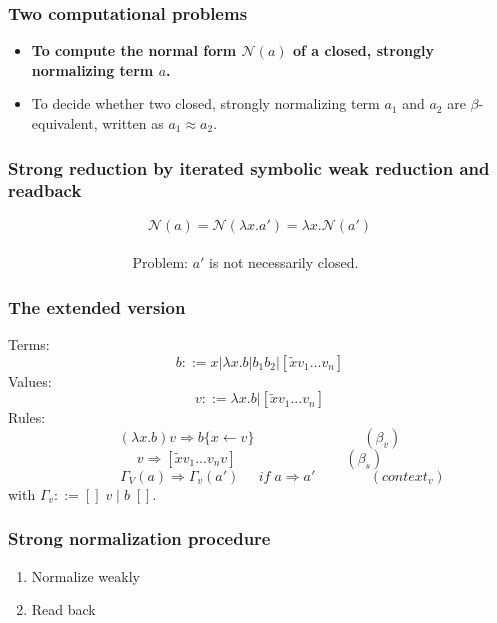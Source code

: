 \documentclass{beamer}
\begin{document}
\begin{frame}
\frametitle{Two computational problems}
\begin{itemize}
\item \textbf{To compute the normal form $\mathcal{N}(a)$ of a closed, strongly normalizing term $a$.}
\item To decide whether two closed, strongly normalizing term $a_1$ and $a_2$ are $\beta$-equivalent, written as $a_1 \approx a_2$.
\end{itemize}
\end{frame}

\begin{frame}
\frametitle{Strong reduction by iterated symbolic weak reduction and readback}
\begin{equation*}
\mathcal{N}(a) = \mathcal{N}(\lambda x.a') = \lambda x.\mathcal{N}(a')
\end{equation*}
$\;$\\
$\;\;\;\;\;\;\;\;\;\;\;\;\;\;\;\;\;\;\;\;\;\;\;\;\;\;\;\;\;\;\;\;$Problem: $a'$ is not necessarily closed.

\end{frame}

\begin{frame}
\frametitle{The extended version}
Terms:
\begin{equation*}
b ::= x | \lambda x.b | b_1 b_2 | [\tilde{x} v_1 ... v_n]
\end{equation*}
Values:
\begin{equation*}
v ::= \lambda x.b | [\tilde{x} v_1 ... v_n]
\end{equation*}
Rules: 
\begin{equation*}
(\lambda x.b) v  \Rightarrow b\{x \leftarrow v\} \;\;\;\;\;\;\;\;\;\;\;\;\;\;\;\;\;\;\;\;\;\;\;\;\;\;\;\;(\beta_v)
\end{equation*}
\begin{equation*}
[\tilde{x} v_1 ... v_n] v  \Rightarrow [\tilde{x} v_1 ... v_n v] \;\;\;\;\;\;\;\;\;\;\;\;\;\;\;\;\;\;\;\;\;\;\;\;\;\;\;\;(\beta_s)
\end{equation*}
\begin{equation*}
\;\;\;\;\;\;\;\;\;\;\;\:\Gamma_V(a)  \Rightarrow \Gamma_v (a') \;\;\;\;\; if\; a \Rightarrow a'  \;\;\;\;\;\;\;\;\;\;\;\;\;\; (context_v)
\end{equation*}
with $\Gamma_v ::= []\; v\; |\; b\; [] $.

\end{frame}

\begin{frame}
\frametitle{Strong normalization procedure}
\begin{enumerate}
\item Normalize weakly
\item Read back 
\end{enumerate}

\end{frame}
\end{document}
